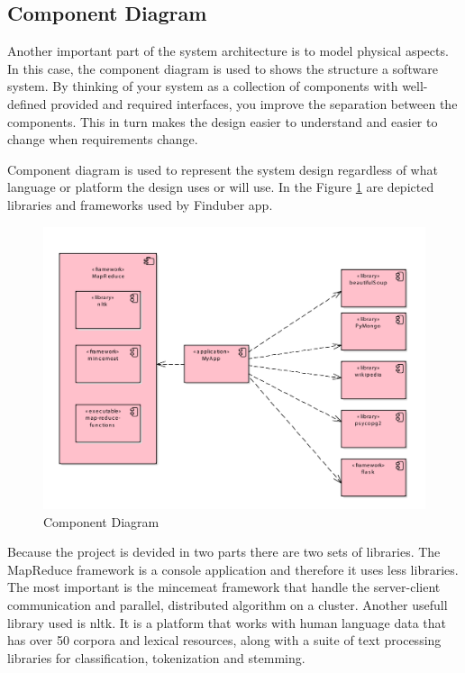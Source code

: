 \subsection{Component Diagram}

Another important part of the system architecture is to model physical aspects. In this case, the component diagram is used to shows the structure a software system. By thinking of your system as a collection of components with well-defined provided and required interfaces, you improve the separation between the components. This in turn makes the design easier to understand and easier to change when requirements change.

Component diagram is used to represent the system design regardless of what language or platform the design uses or will use. In the Figure \ref{component_uml} are depicted libraries and frameworks used by Finduber app.
 
\begin{figure}[!ht]
\centering
\includegraphics[width=15cm]{Component}
\caption{Component Diagram}\label{component_uml}
\end{figure}

Because the project is devided in two parts there are two sets of libraries. The MapReduce framework is a console application and therefore it uses less libraries. The most important is the mincemeat framework that handle the server-client communication and parallel, distributed algorithm on a cluster. Another usefull library used is nltk. It is a platform that works with human language data that has over 50 corpora and lexical resources, along with a suite of text processing libraries for classification, tokenization and stemming. 

